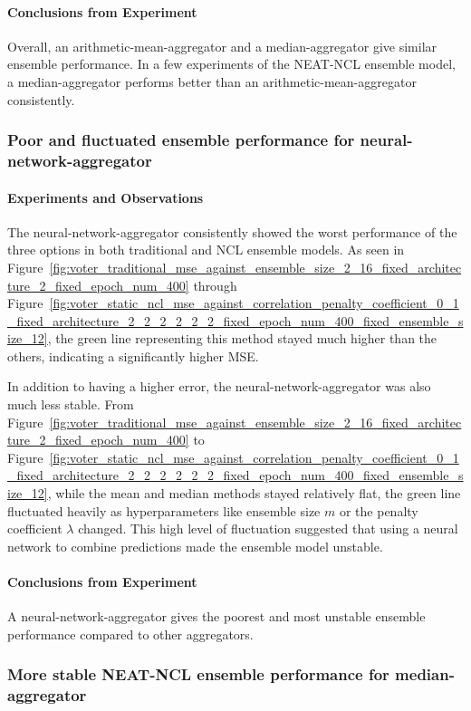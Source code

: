 \documentclass{article}
\begin{document}
\paragraph{Conclusions from Experiment}
Overall, an arithmetic-mean-aggregator and a median-aggregator give similar ensemble performance. In a few experiments of the NEAT-NCL ensemble model, a median-aggregator performs better than an arithmetic-mean-aggregator consistently. 


\subsubsection{Poor and fluctuated ensemble performance for neural-network-aggregator}
\paragraph{Experiments and Observations}
The neural-network-aggregator consistently showed the worst performance of the three options in both traditional and NCL ensemble models. As seen in Figure~\ref{fig:voter_traditional_mse_against_ensemble_size_2_16_fixed_architecture_2_fixed_epoch_num_400} through Figure~\ref{fig:voter_static_ncl_mse_against_correlation_penalty_coefficient_0_1_fixed_architecture_2_2_2_2_2_2_fixed_epoch_num_400_fixed_ensemble_size_12}, the green line representing this method stayed much higher than the others, indicating a significantly higher MSE. 

In addition to having a higher error, the neural-network-aggregator was also much less stable. From Figure~\ref{fig:voter_traditional_mse_against_ensemble_size_2_16_fixed_architecture_2_fixed_epoch_num_400} to Figure~\ref{fig:voter_static_ncl_mse_against_correlation_penalty_coefficient_0_1_fixed_architecture_2_2_2_2_2_2_fixed_epoch_num_400_fixed_ensemble_size_12}, while the mean and median methods stayed relatively flat, the green line fluctuated heavily as hyperparameters like ensemble size $m$ or the penalty coefficient $\lambda$ changed. This high level of fluctuation suggested that using a neural network to combine predictions made the ensemble model unstable. 

\paragraph{Conclusions from Experiment}
A neural-network-aggregator gives the poorest and most unstable ensemble performance compared to other aggregators. 


\subsubsection{More stable NEAT-NCL ensemble performance for median-aggregator}
\end{document}
